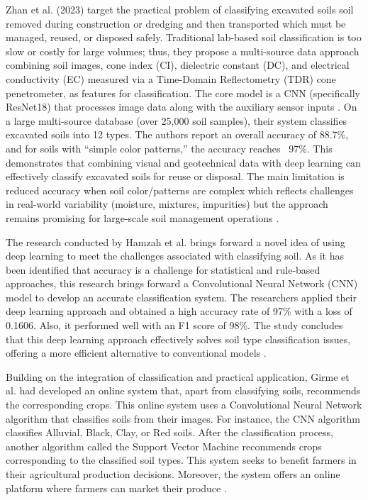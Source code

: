 \documentclass[conference]{IEEEtran}
\begin{document}
Zhan et al. (2023) target the practical problem of classifying excavated soils soil removed during construction or dredging and then transported which must be managed, reused, or disposed safely. Traditional lab-based soil classification is too slow or costly for large volumes; thus, they propose a multi-source data approach combining soil images, cone index (CI), dielectric constant (DC), and electrical conductivity (EC) measured via a Time-Domain Reflectometry (TDR) cone penetrometer, as features for classification. The core model is a CNN (specifically ResNet18) that processes image data along with the auxiliary sensor inputs \cite{b13}. On a large multi-source database (over 25,000 soil samples), their system classifies excavated soils into 12 types. The authors report an overall accuracy of 88.7\%, and for soils with “simple color patterns,” the accuracy reaches ~97\%. This demonstrates that combining visual and geotechnical data with deep learning can effectively classify excavated soils for reuse or disposal. The main limitation is reduced accuracy when soil color/patterns are complex which reflects challenges in real-world variability (moisture, mixtures, impurities) but the approach remains promising for large-scale soil management operations  \cite{b13}.
\vspace{5pt}


The research conducted by Hamzah et al. brings forward a novel idea of using deep learning to meet the challenges associated with classifying soil. As it has been identified that accuracy is a challenge for statistical and rule-based approaches, this research brings forward a Convolutional Neural Network (CNN) model to develop an accurate classification system. The researchers applied their deep learning approach and obtained a high accuracy rate of 97\% with a loss of 0.1606. Also, it performed well with an F1 score of 98\%. The study concludes that this deep learning approach effectively solves soil type classification issues, offering a more efficient alternative to conventional models \cite{b14}.
\vspace{5pt}


Building on the integration of classification and practical application, Girme et al. had developed an online system that, apart from classifying soils, recommends the corresponding crops. This online system uses a Convolutional Neural Network algorithm that classifies soils from their images. For instance, the CNN algorithm classifies Alluvial, Black, Clay, or Red soils. After the classification process, another algorithm called the Support Vector Machine recommends crops corresponding to the classified soil types. This system seeks to benefit farmers in their agricultural production decisions. Moreover, the system offers an online platform where farmers can market their produce \cite{b15}.
\vspace{5pt}
\end{document}
